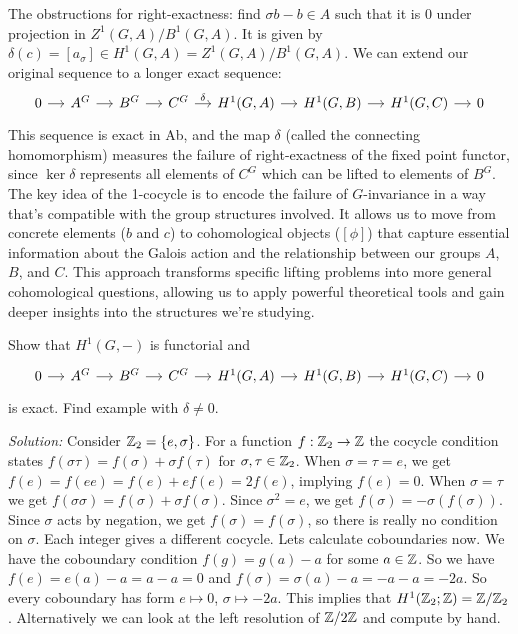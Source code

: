 \begin{outline}
    \1[] The obstructions for right-exactness: find $\sigma b -b \in A$ such that it is $0$ under projection in $Z^1(G,A)/B^1(G,A)$. It is given by $\delta(c) = [a_\sigma]\in H^1(G,A) = Z^1(G,A)/B^1(G,A)$. We can extend our original sequence to a longer exact sequence:
    $$\begin{tikzcd}[column sep=small]
    0 \arrow[r] & A^G \arrow[r] & B^G \arrow[r] & C^G \arrow[r, "\delta"] & H^1(G,A) \arrow[r] & H^1(G,B) \arrow[r] & H^1(G,C) \arrow[r] & 0
    \end{tikzcd}$$
    This sequence is exact in Ab, and the map $\delta$ (called the connecting homomorphism) measures the failure of right-exactness of the fixed point functor, since $\ker \delta$ represents all elements of $C^G$ which can be lifted to elements of $B^G$.
    \1 The key idea of the 1-cocycle is to encode the failure of $G$-invariance in a way that's compatible with the group structures involved. It allows us to move from concrete elements ($b$ and $c$) to cohomological objects ($[\phi]$) that capture essential information about the Galois action and the relationship between our groups $A$, $B$, and $C$.
    This approach transforms specific lifting problems into more general cohomological questions, allowing us to apply powerful theoretical tools and gain deeper insights into the structures we're studying.

\begin{exercise}
    Show that $H^1(G,-)$ is functorial and 
    $$\begin{tikzcd}[column sep=small]
    0 \arrow[r] & A^G \arrow[r] & B^G \arrow[r] & C^G \arrow[r] & H^1(G,A) \arrow[r] & H^1(G,B) \arrow[r] & H^1(G,C) \arrow[r] & 0
    \end{tikzcd}$$
    is exact. Find example with $\delta \neq 0$.
\end{exercise}

    \1 \textit{Solution:} Consider $\mathbb{Z}_2 = \{e,\sigma\}$. For a function $f:\mathbb{Z}_2\rightarrow \mathbb{Z}$ the cocycle condition states $f(\sigma\tau)=f(\sigma)+\sigma f(\tau)$ for $\sigma,\tau \in \mathbb{Z}_2$. When $\sigma = \tau = e$, we get $f(e)=f(e e)=f(e)+ef(e)= 2f(e)$, implying $f(e)=0$. When $\sigma=\tau$ we get $f(\sigma \sigma)=f(\sigma)+\sigma f(\sigma)$. Since $\sigma^2 = e$, we get $f(\sigma)=-\sigma(f(\sigma))$. Since $\sigma$ acts by negation, we get $f(\sigma)=f(\sigma)$, so there is really no condition on $\sigma$. Each integer gives a different cocycle. Lets calculate coboundaries now. We have the coboundary condition $f(g)=g(a)-a$ for some $a\in\mathbb{Z}$. So we have $f(e)=e(a)-a=a-a=0$ and $f(\sigma)=\sigma(a)-a=-a-a=-2a$. So every coboundary has form $e\mapsto 0$, $\sigma \mapsto -2a$. This implies that $H^1(\mathbb{Z}_2;\mathbb{Z})=\mathbb{Z}/\mathbb{Z}_2$. Alternatively we can look at the left resolution of $\mathbb{Z}/2\mathbb{Z}$ and compute by hand.


\end{outline}
